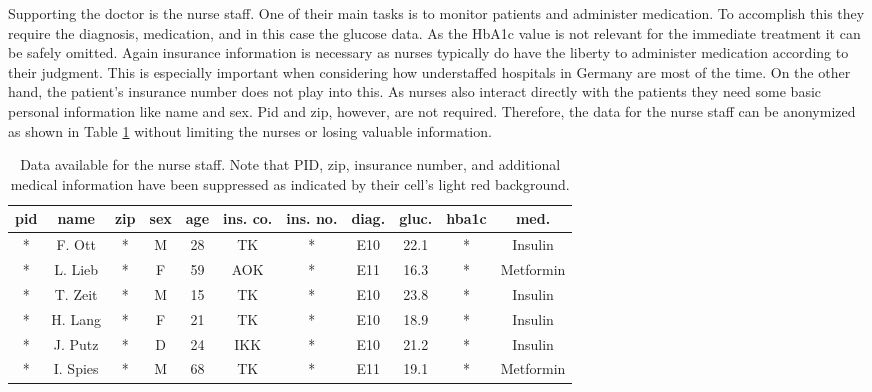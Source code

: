 Supporting the doctor is the nurse staff. One of their main tasks is to monitor patients and administer medication. To accomplish this they require the diagnosis, medication, and in this case the glucose data. As the HbA1c value is not relevant for the immediate treatment it can be safely omitted. 
Again insurance information is necessary as nurses typically do have the liberty to administer medication according to their judgment. This is especially important when considering how understaffed hospitals in Germany are most of the time. On the other hand, the patient's insurance number does not play into this. As nurses also interact directly with the patients they need some basic personal information like name and sex. 
Pid and zip, however, are not required. Therefore, the data for the nurse staff can be anonymized as shown in Table \ref{table:nurse} without limiting the nurses or losing valuable information. 

\bigskip

\begin{table}[ht]
    \begin{center}
    \footnotesize{
        \renewcommand{\arraystretch}{1.5}
        \begin{tabular}{ | c | c | c | c | c | c | c | c | c | c | c | } 
            \hline
            \cellcolor{lightred} pid & name & \cellcolor{lightred} zip & sex & age & ins. co. & \cellcolor{lightred} ins. no. & diag. & gluc. & \cellcolor{lightred} hba1c & med. \\
            \hline
            \cellcolor{lightred} * & F. Ott & \cellcolor{lightred} * & M & 28 & TK & \cellcolor{lightred} * & E10 & 22.1 & \cellcolor{lightred} * & Insulin \\
            \hline
            \cellcolor{lightred} * & L. Lieb & \cellcolor{lightred} * & F & 59 & AOK & \cellcolor{lightred} * & E11 & 16.3 & \cellcolor{lightred} * & Metformin \\
            \hline 
            \cellcolor{lightred} * & T. Zeit & \cellcolor{lightred} * & M & 15 & TK & \cellcolor{lightred} * & E10 & 23.8 & \cellcolor{lightred} * & Insulin \\
            \hline
            \cellcolor{lightred} * & H. Lang & \cellcolor{lightred} * & F & 21 & TK & \cellcolor{lightred} * & E10 & 18.9 & \cellcolor{lightred} * & Insulin \\
            \hline
            \cellcolor{lightred} * & J. Putz & \cellcolor{lightred} * & D & 24 & IKK & \cellcolor{lightred} * & E10 & 21.2 & \cellcolor{lightred} * & Insulin \\
            \hline
            \cellcolor{lightred} * & I. Spies & \cellcolor{lightred} * & M & 68 & TK & \cellcolor{lightred} * & E11 & 19.1 & \cellcolor{lightred} * & Metformin \\
            \hline
        \end{tabular}
    }
    \caption{Data available for the nurse staff. Note that PID, zip, insurance number, and additional medical information have been suppressed as indicated by their cell's light red background.}
    \label{table:nurse}
    \end{center}
\end{table}

